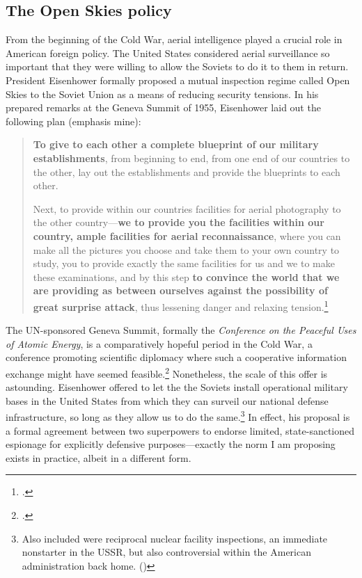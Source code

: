 \documentclass{report}
\begin{document}
\begin{refsegment}
\section{The Open Skies policy}
From the beginning of the Cold War, aerial intelligence played a crucial role in American foreign policy. The United States considered aerial surveillance so important that they were willing to allow the Soviets to do it to them in return. President Eisenhower formally proposed a mutual inspection regime called Open Skies to the Soviet Union as a means of reducing security tensions. In his prepared remarks at the Geneva Summit of 1955, Eisenhower laid out the following plan (emphasis mine):

\begin{quote}
\textbf{To give to each other a complete blueprint of our military establishments}, from beginning to end, from one end of our countries to the other, lay out the establishments and provide the blueprints to each other.
\newline

Next, to provide within our countries facilities for aerial photography to the other country---\textbf{we to provide you the facilities within our country, ample facilities for aerial reconnaissance}, where you can make all the pictures you choose and take them to your own country to study, you to provide exactly the same facilities for us and we to make these examinations, and by this step \textbf{to convince the world that we are providing as between ourselves against the possibility of great surprise attack}, thus lessening danger and relaxing tension.\footcite{eisenhower_president_1955}
\end{quote}

The UN-sponsored Geneva Summit, formally the \emph{Conference on the Peaceful Uses of Atomic Energy}, is a comparatively hopeful period in the Cold War, a conference promoting scientific diplomacy where such a cooperative information exchange might have seemed feasible.\footcite[p.~27]{luscher_nuclear_2018} Nonetheless, the scale of this offer is astounding. Eisenhower offered to let the the Soviets install operational military bases in the United States from which they can surveil our national defense infrastructure, so long as they allow us to do the same.\footnote{Also included were reciprocal nuclear facility inspections, an immediate nonstarter in the USSR, but also controversial within the American administration back home. (\cite{prados_review_2015})} In effect, his proposal is a formal agreement between two superpowers to endorse limited, state-sanctioned espionage for explicitly defensive purposes---exactly the norm I am proposing exists in practice, albeit in a different form.


\end{refsegment}
\end{document}
